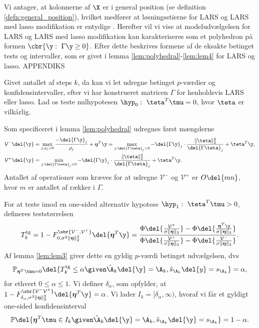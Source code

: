 Vi antager, at kolonnerne af \(\X\) er i general position (se definition \ref{defn:general_position}), hvilket medfører at løsningsstierne for LARS og LARS med lasso modifikation er entydige \citep{lasso_unique}. 
Herefter vil vi vise at modeludvælgelsen for LARS og LARS med lasso modifikation kan karakteriseres som et polyhedron på formen \(\cbr{\y : \ \Gamma \y \geq 0}\).
Efter dette beskrives formene af de eksakte betinget tests og intervaller, som er givet i lemma \ref{lem:polyhedral}-\ref{lem:lem4} for LARS og lasso.
APPENDIKS

Givet antallet af steps \(k\), da kan vi let udregne betinget \(p\)-værdier og konfidensintervaller, efter vi har konstrueret matricen \(\Gamma\) for henholdsvis LARS eller lasso.
Lad os teste nulhypotesen \(\hyp_0: \ \teta^T \tmu = 0\), hvor \(\teta\) er vilkårlig.

Som specificeret i lemma \ref{lem:polyhedral} udregnes først mængderne
\begin{align*}
\mathcal{V}^- \del{\y} &=  \max_{j: \rho_j > 0} \frac{- \del{\Gamma \y}_j}{\rho_j} + \boldsymbol{\eta}^T \y = \max_{j: \del{\Gamma \teta}_j > 0} - \del{\Gamma \y}_j \cdot \frac{\Vert \teta \Vert_2^2}{\del{\Gamma \teta}_j} + \teta^T \y, \\
\mathcal{V}^+ \del{\y} &=\min_{j: \del{\Gamma \teta}_j < 0} - \del{\Gamma \y}_j \cdot \frac{\Vert \teta \Vert_2^2}{\del{\Gamma \teta}_j} + \teta^T \y.
\end{align*}
Antallet af operationer som kræves for at udregne \(\mathcal{V}^-\) og \(\mathcal{V}^+\) er \(O \del{mn}\), hvor \(m\) er antallet af rækker i \(\Gamma\).

For at teste imod en one-sided alternativ hypotese \(\hyp_1: \ \teta^T \tmu > 0\),  defineres teststørrelsen
\begin{align*}
T_k^\text{tg}=1- F_{0, \sigma^2 \Vert \boldsymbol{\eta} \Vert_2^2}^{\sbr{\mathcal{V}^-, \mathcal{V}^+}} \del{\boldsymbol{\eta}^T \y} = \frac{\Phi \del{\frac{\mathcal{V}^+}{\sigma \Vert \boldsymbol{\eta} \Vert_2}}-\Phi \del{\frac{\boldsymbol{\eta}^T \y}{\sigma  \Vert \boldsymbol{\eta} \Vert_2}}}{\Phi \del{\frac{\mathcal{V}^+}{\sigma  \Vert \boldsymbol{\eta} \Vert_2}}-\Phi \del{\frac{\mathcal{V}^-}{\sigma \Vert \boldsymbol{\eta} \Vert_2}}}.
\end{align*}
Af lemma \ref{lem:lem3} giver dette en gyldig \(p\)-værdi betinget udvælgelsen, dvs
\begin{align}
\mathbb{P}_{\boldsymbol{\eta}^T \tmu = 0} \del{T_k^\text{tg} \leq \alpha \given \hat{\A}_k \del{\y} = \A_k, \hat{s}_{\A_k} \del{y} = s_{\A_k}} = \alpha, \label{eq:post_32}
\end{align}
for ethvert \(0 \leq \alpha \leq 1\).
Vi definer  \(\delta_\alpha\), som opfylder, at \(1-F_{\delta_{\alpha}, \sigma^2 \Vert \boldsymbol{\eta} \Vert_2^2}^{\sbr{\mathcal{V}^- \mathcal{V}^+}} \del{\boldsymbol{\eta}^T \y} = \alpha\).
Vi lader \(I_k = [\delta_\alpha, \infty)\), hvoraf vi får et gyldigt one-sided konfidensinterval
\begin{align}
\mathbb{P} \del{\boldsymbol{\eta}^T \tmu \in I_k \given \hat{\A}_k \del{\y} = \A_k, \hat{s}_{\A_k} \del{\y} = s_{\A_k}} = 1-\alpha. \label{eq:post_33}
\end{align}

